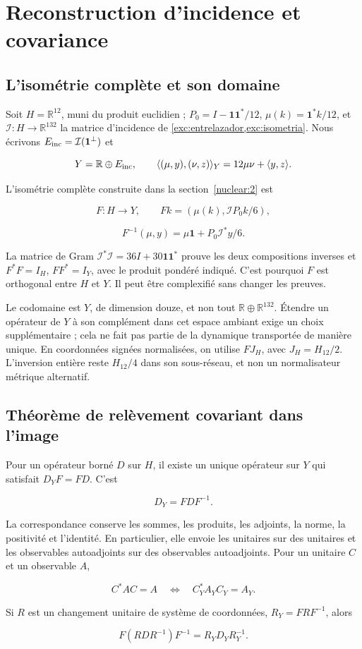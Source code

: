 \section{Reconstruction d’incidence et covariance}
\label{nuclear:5}
\subsection{L’isométrie complète et son domaine}\label{nuc05:isometria}

Soit \(H=\mathbb R^{12}\), muni du produit euclidien ; \(P_0=I-\mathbf1\mathbf1^*/12\), \(\mu(k)=\mathbf1^*k/12\), et \(\mathcal I:H\to\mathbb R^{132}\) la matrice d’incidence de \cref{exc:entrelazador,exc:isometria}. Nous écrivons \(E_{\rm inc}=\mathcal I(\mathbf1^\perp)\) et

\[
Y=\mathbb R\oplus E_{\rm inc},\qquad
\langle(\mu,y),(\nu,z)\rangle_Y=12\mu\nu+\langle y,z\rangle.
\]

L’isométrie complète construite dans la section~\ref{nuclear:2} est

\[
F:H\longrightarrow Y,\qquad Fk=(\mu(k),\mathcal I P_0k/6),
\]

\[
F^{-1}(\mu,y)=\mu\mathbf1+P_0\mathcal I^*y/6.
\]

La matrice de Gram \(\mathcal I^*\mathcal I=36I+30\mathbf1\mathbf1^*\) prouve les deux compositions inverses et \(F^*F=I_H\), \(FF^*=I_Y\), avec le produit pondéré indiqué. C’est pourquoi \(F\) est orthogonal entre \(H\) et \(Y\). Il peut être complexifié sans changer les preuves.

Le codomaine est \(Y\), de dimension douze, et non tout \(\mathbb R\oplus\mathbb R^{132}\). Étendre un opérateur de \(Y\) à son complément dans cet espace ambiant exige un choix supplémentaire ; cela ne fait pas partie de la dynamique transportée de manière unique. En coordonnées signées normalisées, on utilise \(FJ_H\), avec \(J_H=H_{12}/2\). L’inversion entière reste \(H_{12}/4\) dans son sous-réseau, et non un normalisateur métrique alternatif.

\subsection{Théorème de relèvement covariant dans l’image
}\label{nuc05:levantamiento}

\begin{theorem}
Pour un opérateur borné \(D\) sur \(H\), il existe un unique opérateur sur \(Y\) qui satisfait \(D_YF=FD\). C’est


\[
D_Y=FDF^{-1}.
\]

La correspondance conserve les sommes, les produits, les adjoints, la norme, la positivité et l’identité. En particulier, elle envoie les unitaires sur des unitaires et les observables autoadjoints sur des observables autoadjoints. Pour un unitaire \(C\) et un observable \(A\),

\[
C^*AC=A\quad\Longleftrightarrow\quad C_Y^*A_YC_Y=A_Y.
\]

Si \(R\) est un changement unitaire de système de coordonnées, \(R_Y=FRF^{-1}\), alors

\[
F(RDR^{-1})F^{-1}=R_YD_YR_Y^{-1}.
\]
\end{theorem}

